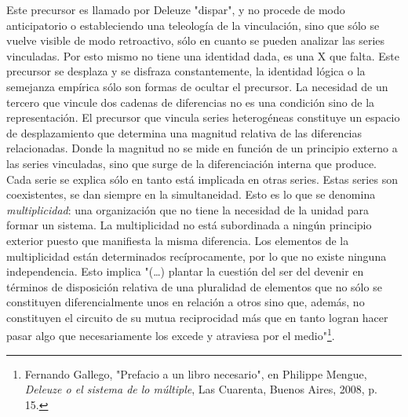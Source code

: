 \documentclass{book}
\begin{document}
Este precursor es llamado por Deleuze "dispar", y no procede de modo
anticipatorio o estableciendo una teleología de la vinculación, sino que
sólo se vuelve visible de modo retroactivo, sólo en cuanto se pueden
analizar las series vinculadas. Por esto mismo no tiene una identidad
dada, es una X que falta. Este precursor se desplaza y se disfraza
constantemente, la identidad lógica o la semejanza empírica sólo son
formas de ocultar el precursor. La necesidad de un tercero que vincule
dos cadenas de diferencias no es una condición sino de la
representación. El precursor que vincula series heterogéneas constituye
un espacio de desplazamiento que determina una magnitud relativa de las
diferencias relacionadas. Donde la magnitud no se mide en función de un
principio externo a las series vinculadas, sino que surge de la
diferenciación interna que produce. Cada serie se explica sólo en tanto
está implicada en otras series. Estas series son coexistentes, se dan
siempre en la simultaneidad. Esto es lo que se denomina
\emph{multiplicidad}: una organización que no tiene la necesidad de la
unidad para formar un sistema. La multiplicidad no está subordinada a
ningún principio exterior puesto que manifiesta la misma diferencia. Los
elementos de la multiplicidad están determinados recíprocamente, por lo
que no existe ninguna independencia. Esto implica "(\dots) plantar
la cuestión del ser del devenir en términos de disposición relativa de
una pluralidad de elementos que no sólo se constituyen diferencialmente
unos en relación a otros sino que, además, no constituyen el circuito de
su mutua reciprocidad más que en tanto logran hacer pasar algo que
necesariamente los excede y atraviesa por el medio"\footnote{Fernando
  Gallego, "Prefacio a un libro necesario", en Philippe Mengue,
  \emph{Deleuze o el sistema de lo múltiple}, Las Cuarenta, Buenos
  Aires, 2008, p. 15.}.
\end{document}
